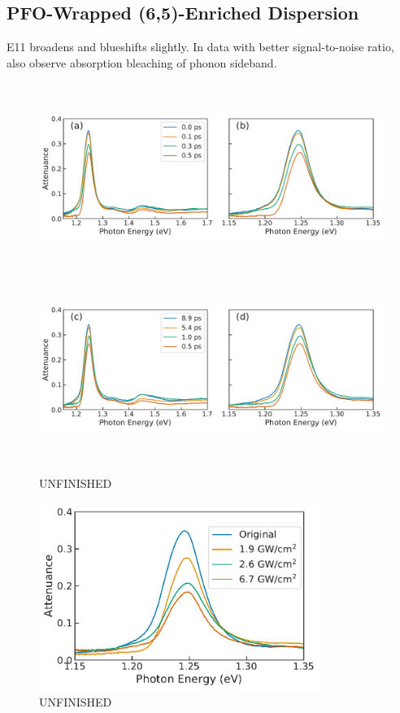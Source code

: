 \clearpage
\subsection{PFO-Wrapped (6,5)-Enriched Dispersion}

E11 broadens and blueshifts slightly. In data with better signal-to-noise ratio, also observe absorption bleaching of phonon sideband.

\begin{figure}[ht]%
	\centering
	{\includegraphics[height=2.4in]{images/chapter_my_data/Jan_CNT_ABS_1mW_decay} }
	{\includegraphics[height=2.4in]{images/chapter_my_data/Jan_CNT_ABS_1mW_recovery} }
	\caption{{\color{red} UNFINISHED}}
\end{figure}

\begin{figure}[ht]
	\centering
	\includegraphics[height=2.4in]{images/chapter_my_data/Jan_CNT_max_abs_change}
	\caption{{\color{red} UNFINISHED}}
\end{figure}

